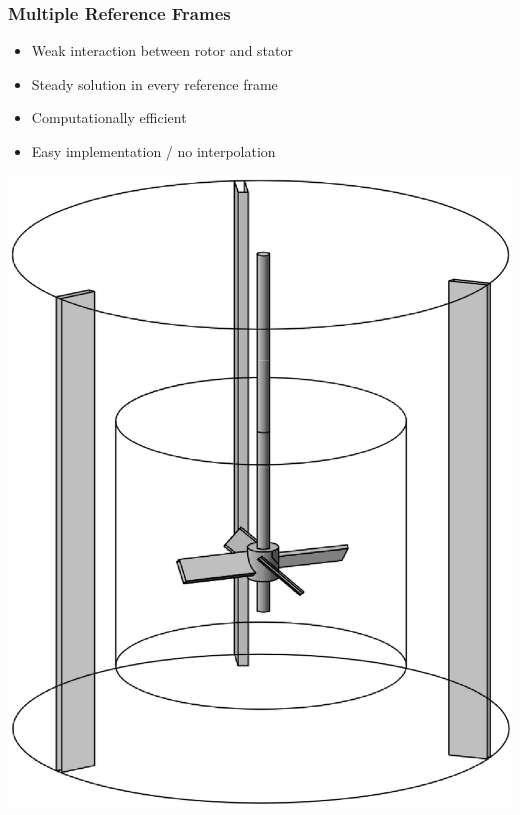 \documentclass[10pt,xcolor=dvipsnames]{beamer}
\begin{document}
\begin{frame}[t]
\frametitle{Multiple Reference Frames}
\vspace*{1cm}
\begin{minipage}{\columnwidth}
 \begin{minipage}{0.49\columnwidth}
  \begin{itemize}
   \item Weak interaction between rotor and stator
   \item Steady solution in every reference frame
  \end{itemize}
  \begin{itemize}
    \item Computationally efficient
    \item Easy implementation / no interpolation
  \end{itemize}
 \end{minipage}
 \begin{minipage}{0.49\columnwidth}
  \qquad\includegraphics[width=0.85\columnwidth]{mrf}
 \end{minipage}


\end{minipage}


\end{frame}
\end{document}
